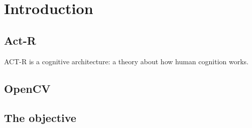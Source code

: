 \chapter{Introduction}
\section{Act-R}
ACT-R is a cognitive architecture: a theory about how human cognition works. 
\section{OpenCV}
\section{The objective}